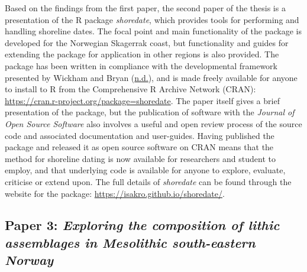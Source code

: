\documentclass[
  12pt,
  a4paper,
  oneside]{book}
\begin{document}
Based on the findings from the first paper, the second paper of the thesis is a presentation of the R package \emph{shoredate}, which provides tools for performing and handling shoreline dates. The focal point and main functionality of the package is developed for the Norwegian Skagerrak coast, but functionality and guides for extending the package for application in other regions is also provided. The package has been written in compliance with the developmental framework presented by Wickham and Bryan (\protect\hyperlink{ref-wickhamnd}{n.d.}), and is made freely available for anyone to install to R from the Comprehensive R Archive Network (CRAN): \url{https://cran.r-project.org/package=shoredate}. The paper itself gives a brief presentation of the package, but the publication of software with the \emph{Journal of Open Source Software} also involves a useful and open review process of the source code and associated documentation and user-guides. Having published the package and released it as open source software on CRAN means that the method for shoreline dating is now available for researchers and student to employ, and that underlying code is available for anyone to explore, evaluate, criticise or extend upon. The full details of \emph{shoredate} can be found through the website for the package: \url{https://isakro.github.io/shoredate/}.

\hypertarget{paper-3-exploring-the-composition-of-lithic-assemblages-in-mesolithic-south-eastern-norway}{%
\subsection{\texorpdfstring{Paper 3: \emph{Exploring the composition of lithic assemblages in Mesolithic south-eastern Norway}}{Paper 3: Exploring the composition of lithic assemblages in Mesolithic south-eastern Norway}}\label{paper-3-exploring-the-composition-of-lithic-assemblages-in-mesolithic-south-eastern-norway}}
\end{document}
